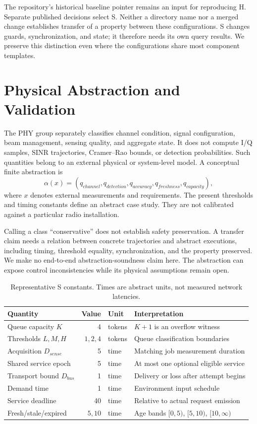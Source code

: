\documentclass[runningheads]{llncs}
\begin{document}
The repository's historical baseline pointer remains an input for reproducing H. Separate published decisions select S. Neither a directory name nor a merged change establishes transfer of a property between these configurations. S changes guards, synchronization, and state; it therefore needs its own query results. We preserve this distinction even where the configurations share most component templates.

\section{Physical Abstraction and Validation}\label{sec:validation}
The PHY group separately classifies channel condition, signal configuration, beam management, sensing quality, and aggregate state. It does not compute I/Q samples, SINR trajectories, Cramer--Rao bounds, or detection probabilities. Such quantities belong to an external physical or system-level model. A conceptual finite abstraction is
\begin{equation}
\alpha(x)=(q_{channel},q_{detection},q_{accuracy},q_{freshness},q_{capacity}),
\end{equation}
where $x$ denotes external measurements and requirements. The present thresholds and timing constants define an abstract case study. They are not calibrated against a particular radio installation.

Calling a class ``conservative'' does not establish safety preservation. A transfer claim needs a relation between concrete trajectories and abstract executions, including timing, threshold equality, synchronization, and the property preserved. We make no end-to-end abstraction-soundness claim here. The abstraction can expose control inconsistencies while its physical assumptions remain open.

\begin{table}[t]
\caption{Representative S constants. Times are abstract units, not measured network latencies.}\label{tab:parameters}
\centering\small
\begin{tabularx}{\textwidth}{@{}lrlX@{}}
\toprule Quantity & Value & Unit & Interpretation\\\midrule
Queue capacity $K$ & 4 & tokens & $K+1$ is an overflow witness\\
Thresholds $L,M,H$ & $1,2,4$ & tokens & Queue classification boundaries\\
Acquisition $D_{sense}$ & 5 & time & Matching job measurement duration\\
Shared service epoch & 5 & time & At most one optional eligible service\\
Transport bound $D_{bus}$ & 1 & time & Delivery or loss after attempt begins\\
Demand time & 1 & time & Environment input schedule\\
Service deadline & 40 & time & Relative to actual request emission\\
Fresh/stale/expired & $5,10$ & time & Age bands $[0,5)$, $[5,10)$, $[10,\infty)$\\\bottomrule
\end{tabularx}
\end{table}
\end{document}
